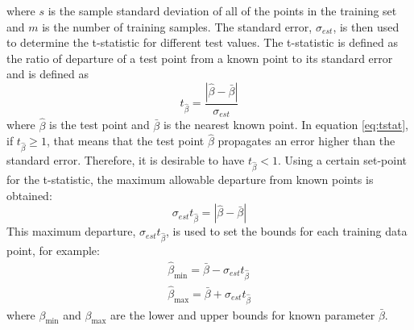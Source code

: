 \documentclass[letterpaper, 10 pt, conference]{ieeeconf}  %
\begin{document}
where $s$ is the sample standard deviation of all of the points in the training set and $m$ is the number of training samples. The standard error, $\sigma_{est}$, is then used to determine the t-statistic for different test values. The t-statistic is defined as the ratio of departure of a test point from a known point to its standard error and is defined as
\begin{equation} \label{eq:tstat}
t_{\hat{\beta}} = \frac{|\hat{\beta}-\bar{\beta}|}{\sigma_{est}}    
\end{equation}
where $\hat{\beta}$ is the test point and $\bar{\beta}$ is the nearest known point. In equation \eqref{eq:tstat}, if $t_{\hat{\beta}} \geq 1$, that means that the test point $\hat{\beta}$ propagates an error higher than the standard error. Therefore, it is desirable to have $t_{\hat{\beta}} < 1$. Using a certain set-point for the t-statistic, the maximum allowable departure from known points is obtained:
\begin{equation}
    \sigma_{est}t_{\hat{\beta}} = |\hat{\beta}-\bar{\beta}|
\end{equation}
This maximum departure, $\sigma_{est}t_{\hat{\beta}}$, is used to set the bounds for each training data point, for example:
\begin{align}
    \hat{\beta}_{\min} = \bar{\beta} - \sigma_{est}t_{\hat{\beta}} \nonumber \\
    \hat{\beta}_{\max} = \bar{\beta} + \sigma_{est}t_{\hat{\beta}}
\end{align}
where $\beta_{\min}$ and $\beta_{\max}$ are the lower and upper bounds for known parameter $\bar{\beta}$.
\end{document}
